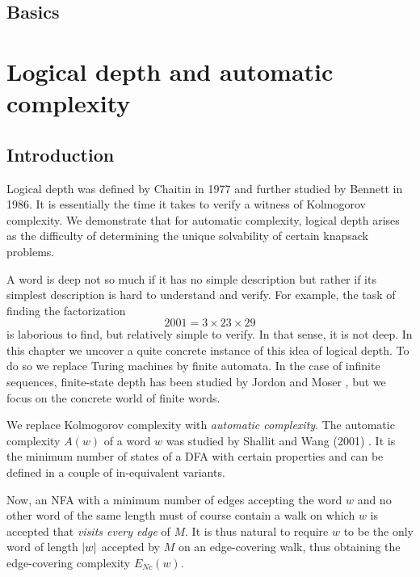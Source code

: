 \section{Basics}

\chapter{Logical depth and automatic complexity}\label{chap:depth}

\section{Introduction}

	Logical depth was defined by Chaitin in 1977 \cite{5390997} and further studied by Bennett in 1986. It is essentially the time it takes to verify a witness of Kolmogorov complexity.
	We demonstrate that for automatic complexity, logical depth arises as the difficulty of determining the unique solvability of certain knapsack problems.

	A word is deep not so much if it has no simple description but rather if its simplest description is hard to understand and verify. For example, the task of finding the factorization
	\[
	2001 = 3 \times 23 \times 29
	\]
	is laborious to find, but relatively simple to verify. In that sense, it is not deep.
	In this chapter we uncover a quite concrete instance of this idea of logical depth. To do so we replace Turing machines by finite automata.
	In the case of infinite sequences, finite-state depth has been studied by Jordon and Moser \cite{MR4074827}, but we focus on the concrete world of finite words.

	We replace Kolmogorov complexity with \emph{automatic complexity}.
	The automatic complexity $A(w)$ of a word $w$ was studied by Shallit and Wang (2001) \cite{MR1897300}.
	It is the minimum number of states of a DFA with certain properties and can be defined in a couple of in-equivalent variants.
	

	Now, an NFA with a minimum number of edges accepting the word $w$ and no other word of the same length must of course contain a walk on which
	$w$ is accepted that \emph{visits every edge} of $M$.	
	It is thus natural to require $w$ to be the only word of length $\lvert w\rvert$ accepted by $M$ on an edge-covering walk,
	thus obtaining the edge-covering complexity $E_{Nc}(w)$.


